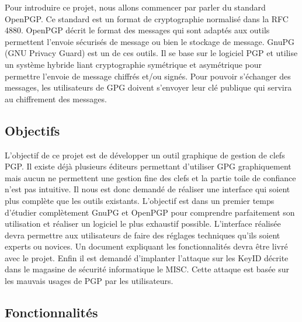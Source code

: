 \documentclass{../res/univ-projet}
\begin{document}
Pour introduire ce projet, nous allons commencer par parler du standard OpenPGP. Ce standard est un format de cryptographie normalisé dans la RFC 4880. OpenPGP décrit le format des messages qui sont adaptés aux outils permettent l'envoie sécurisés de message ou bien le stockage de message.
GnuPG (GNU Privacy Guard) est un de ces outils. Il se base sur le logiciel PGP et utilise un système hybride liant cryptographie symétrique et asymétrique pour permettre l'envoie de message chiffrés et/ou signés. Pour pouvoir s'échanger des messages, les utilisateurs de GPG doivent s'envoyer leur clé publique qui servira au chiffrement des messages.

  \subsection{Objectifs}
  L'objectif de ce projet est de développer un outil graphique de gestion de clefs PGP. Il existe déjà plusieurs éditeurs permettant d'utiliser GPG graphiquement mais aucun ne permettent une gestion fine des clefs et la partie toile de confiance n'est pas intuitive. Il nous est donc demandé de réaliser une interface qui soient plus complète que les outils existants. L'objectif est dans un premier temps d'étudier complètement GnuPG et OpenPGP pour comprendre parfaitement son utilisation et réaliser un logiciel le plus exhaustif possible. L'interface réalisée devra permettre aux utilisateurs de faire des réglages techniques qu'ils soient experts ou novices. Un document expliquant les fonctionnalités devra être livré avec le projet.
  Enfin il est demandé d'implanter l'attaque sur les KeyID décrite dans le magasine de sécurité informatique le MISC. Cette attaque est basée sur les mauvais usages de PGP par les utilisateurs.
  
  \newpage
  
  \subsection{Fonctionnalités}
  
\end{document}

